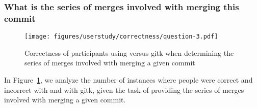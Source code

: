 


\subsubsection{What is the series of merges involved with merging this commit}
\label{ssub:what_is_the_series_of_merges_involved_with_merging_this_commit}

\begin{figure}[htpb]
  \centering
  \texttt{[image: figures/userstudy/correctness/question-3.pdf]}
  \caption{Correctness of participants using \tool versus gitk
    when determining the series of merges involved with merging a given
  commit}
  \label{fig:q_3_correctness}
\end{figure}

In Figure~\ref{fig:q_3_correctness}, we analyze the number of instances
where people were correct and incorrect with \tool and with gitk, given
the task of providing the series of merges involved with merging a given
commit.

